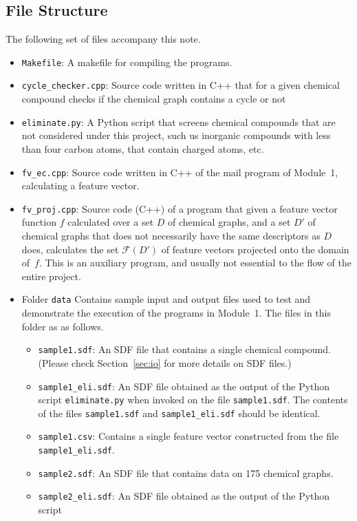 \documentclass[11pt, titlepage, dvipdfmx, twoside]{article}
\newcommand{\secref}[1]{Section~\ref{sec:#1}}
\begin{document}
\subsection{File Structure}
The following set of files accompany this note.
\begin{itemize}
\item {\tt Makefile}: 
A makefile for compiling the programs. 
%
\item {\tt cycle\_checker.cpp}: 
Source code written in C++ that for a given chemical compound checks if 
the chemical graph contains a cycle or not
\item {\tt eliminate.py}: 
A Python script that screens chemical compounds that are not
considered under this project, such us inorganic
compounds with less than four carbon atoms, 
that contain charged atoms, etc.
%
\item {\tt fv\_ec.cpp}: 
Source code written in C++ 
of the mail program of Module~1,
calculating a feature vector.
%
\item {\tt fv\_proj.cpp}: 
Source code (C++) of a program
that given a feature vector function $f$
calculated over a set $D$ of chemical graphs,
and a set $D'$ of chemical graphs that does not necessarily have the same
descriptors as $D$ does, 
calculates the set ${\mathcal F}(D')$ of feature vectors
projected onto the domain of~$f$.
This is an auxiliary program, 
and usually not essential to the flow of the entire project.
%
\item Folder {\tt data} 
Contains sample input and output files
used to test and demonstrate the execution of the
programs in Module~1.
The files in this folder as as follows.
%
\begin{itemize}
  \item {\tt sample1.sdf}: 
  An SDF file that contains a single chemical compound.
  (Please check \secref{io} for more details on SDF files.)
  \item {\tt sample1\_eli.sdf}: 
  An SDF file obtained as the output of the Python script 
  {\tt eliminate.py} when invoked on the file {\tt sample1.sdf}.
  The contents of the files {\tt sample1.sdf} and {\tt sample1\_eli.sdf}
  should be identical.
  \item {\tt sample1.csv}: 
  Contains a single feature vector
  constructed from the file
  {\tt sample1\_eli.sdf}.
  \item {\tt sample2.sdf}: 
  An SDF file that contains data on 175 chemical graphs.
%
  \item {\tt sample2\_eli.sdf}: 
    An SDF file obtained as the output of the Python script 

\end{itemize}
\end{itemize}
\end{document}
